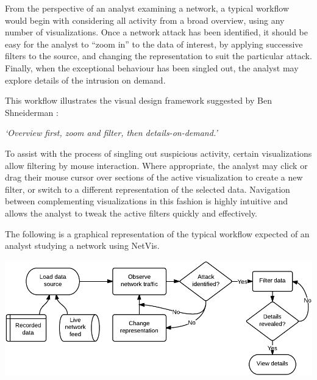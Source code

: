 From the perspective of an analyst examining a network, a typical workflow
would begin with considering all activity from a broad overview, using any
number of visualizations. Once a network attack has been identified, it should
be easy for the analyst to ``zoom in'' to the data of interest, by applying
successive filters to the source, and changing the representation to suit the
particular attack. Finally, when the exceptional behaviour has been singled
out, the analyst may explore details of the intrusion on demand.

This workflow illustrates the visual design framework suggested by Ben
Shneiderman \cite{shneiderman1996designing}:

\begin{center}
    \textit{`Overview first, zoom and filter, then details-on-demand.'}
\end{center}

To assist with the process of singling out suspicious activity, certain
visualizations allow filtering by mouse interaction. Where appropriate, the
analyst may click or drag their mouse cursor over sections of the active
visualization to create a new filter, or switch to a different representation
of the selected data. Navigation between complementing visualizations in this
fashion is highly intuitive and allows the analyst to tweak the active filters
quickly and effectively.

The following is a graphical representation of the typical workflow expected of
an analyst studying a network using NetVis.

\includegraphics[width=\linewidth]{materials/workflow-diagram.png}
